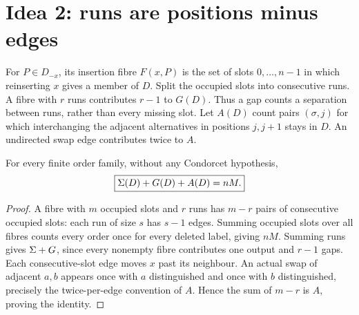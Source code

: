 \section{Idea 2: runs are positions minus edges}\label{sec:fibres}
\begin{definition}\label{def:gaps}
For \(P\in D_{-x}\), its insertion fibre \(F(x,P)\) is the set of
slots \(0,\ldots,n-1\) in which reinserting \(x\) gives a member of
\(D\). Split the occupied slots into consecutive runs. A fibre with
\(r\) runs contributes \(r-1\) to \(G(D)\). Thus a gap counts a
separation between runs, rather than every missing slot.
Let \(A(D)\) count pairs \((\sigma,j)\) for which interchanging the
adjacent alternatives in positions \(j,j+1\) stays in \(D\).
An undirected swap edge contributes twice to \(A\).
\end{definition}

\begin{theorem}\label{thm:fibre}
For every finite order family, without any Condorcet hypothesis,
\[
 \boxed{\Sigma(D)+G(D)+A(D)=nM.}
\]
\end{theorem}
\begin{proof}
A fibre with \(m\) occupied slots and \(r\) runs has \(m-r\) pairs
of consecutive occupied slots: each run of size \(s\) has \(s-1\)
edges. Summing occupied slots over all fibres counts every order once
for every deleted label, giving \(nM\). Summing runs gives \(\Sigma+G\),
since every nonempty fibre contributes one output and \(r-1\) gaps.
Each consecutive-slot edge moves \(x\) past its neighbour. An actual
swap of adjacent \(a,b\) appears once with \(a\) distinguished and
once with \(b\) distinguished, precisely the twice-per-edge convention
of \(A\). Hence the sum of \(m-r\) is \(A\), proving the identity.
\end{proof}

